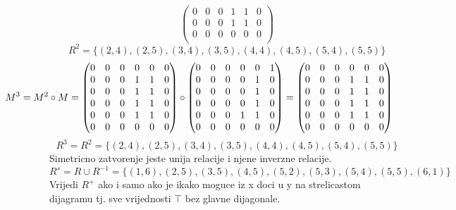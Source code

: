 \documentclass[12pt]{article}
\begin{document}
\begin{enumerate}
\begin{equation*}
\begin{pmatrix}
					0 & 0 & 0 & 1 & 1 & 0\\
					0 & 0 & 0 & 1 & 1 & 0\\
					0 & 0 & 0 & 0 & 0 & 0\\
				\end{pmatrix}
			\end{equation*}
		 	$$R^2 = \{(2, 4), (2, 5), (3, 4), (3, 5), (4, 4), 
		 	(4, 5), (5, 4), (5, 5)\}$$
		 	\begin{equation*}
		 	\hspace{-2cm} M^3 = M^2 \circ M = 
		 	\begin{pmatrix} 
					0 & 0 & 0 & 0 & 0 & 0\\ 
					0 & 0 & 0 & 1 & 1 & 0\\
					0 & 0 & 0 & 1 & 1 & 0\\
					0 & 0 & 0 & 1 & 1 & 0\\
					0 & 0 & 0 & 1 & 1 & 0\\
					0 & 0 & 0 & 0 & 0 & 0\\
				\end{pmatrix} \circ
				\begin{pmatrix} 
					0 & 0 & 0 & 0 & 0 & 1\\ 
					0 & 0 & 0 & 0 & 1 & 0\\
					0 & 0 & 0 & 0 & 1 & 0\\
					0 & 0 & 0 & 0 & 1 & 0\\
					0 & 0 & 0 & 1 & 1 & 0\\
					0 & 0 & 0 & 0 & 0 & 0\\
				\end{pmatrix} = 
				\begin{pmatrix} 
					0 & 0 & 0 & 0 & 0 & 0\\ 
					0 & 0 & 0 & 1 & 1 & 0\\
					0 & 0 & 0 & 1 & 1 & 0\\
					0 & 0 & 0 & 1 & 1 & 0\\
					0 & 0 & 0 & 1 & 1 & 0\\
					0 & 0 & 0 & 0 & 0 & 0\\
				\end{pmatrix}
		 	\end{equation*}
		 	$$R^3 = R^2 = \{(2, 4), (2, 5), (3, 4), (3,
		 	5), (4, 4), (4, 5), (5, 4), (5, 5)\}$$
		 	Simetricno zatvorenje jeste unija relacije i njene
		 	inverzne relacije.
		 	$$R^s = R \cup R^{-1} = \{(1,6),(2,5),(3,5),(4, 5),
		 	(5, 2),(5, 3), (5,4), (5,5), (6, 1)\}$$
		 	Vrijedi $R^+$ ako i samo ako je ikako moguce iz x
		 	doci u y na strelicastom dijagramu tj. sve vrijednosti {$\top$} bez glavne dijagonale.

\end{enumerate}
\end{document}
